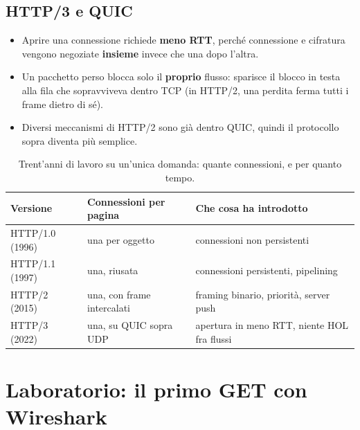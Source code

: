 \subsection{HTTP/3 e QUIC}


\begin{itemize}
    \item Aprire una connessione richiede \textbf{meno RTT}, perché connessione e cifratura vengono negoziate
          \textbf{insieme} invece che una dopo l'altra.
    \item Un pacchetto perso blocca solo il \textbf{proprio} flusso: sparisce il blocco in testa alla fila
          che sopravviveva dentro TCP (in HTTP/2, una perdita ferma tutti i frame dietro di sé).
    \item Diversi meccanismi di HTTP/2 sono già dentro QUIC, quindi il protocollo sopra diventa più semplice.
\end{itemize}

\begin{table}[H]
\centering
\renewcommand{\arraystretch}{1.3}
\begin{tabular}{lll}
\toprule
\textbf{Versione} & \textbf{Connessioni per pagina} & \textbf{Che cosa ha introdotto} \\
\midrule
HTTP/1.0 (1996) & una per oggetto & connessioni non persistenti \\
HTTP/1.1 (1997) & una, riusata & connessioni persistenti, pipelining \\
HTTP/2 (2015) & una, con frame intercalati & framing binario, priorità, server push \\
HTTP/3 (2022) & una, su QUIC sopra UDP & apertura in meno RTT, niente HOL fra flussi \\
\bottomrule
\end{tabular}
\caption{Trent'anni di lavoro su un'unica domanda: quante connessioni, e per quanto tempo.}
\end{table}

\section{Laboratorio: il primo GET con Wireshark}

